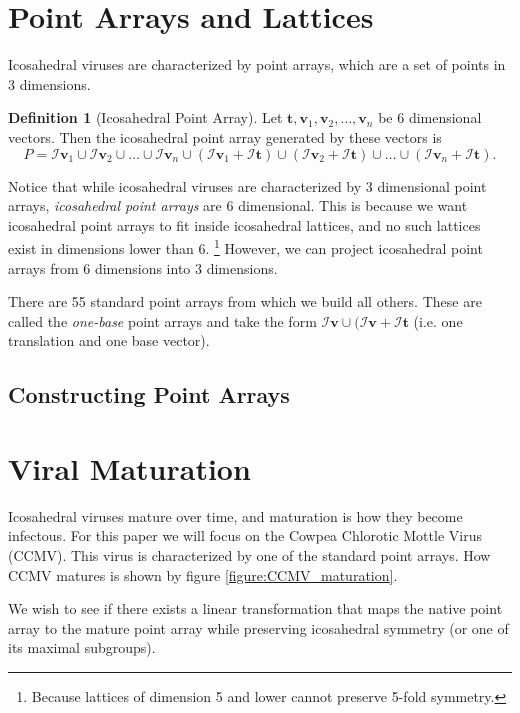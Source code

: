 \documentclass[a4paper,10pt]{article}
\theoremstyle{plain}
\theoremstyle{definition}
\newtheorem{Definition}[Theorem]{Definition}
\theoremstyle{remark}
\renewcommand{\vec}[1]{\textbf{#1}}
\begin{document}
\section{Point Arrays and Lattices}
Icosahedral viruses are characterized by point arrays, which are a set of points in 3 dimensions.
\begin{Definition}[Icosahedral Point Array]
    Let \(\vec{t}, \vec{v}_1, \vec{v}_2, \dots, \vec{v}_n\) be 6 dimensional vectors.
    Then the icosahedral point array generated by these vectors is \[P = \mathcal{I}\vec{v}_1 \cup \mathcal{I}\vec{v}_2 \cup \dots \cup \mathcal{I}\vec{v}_n \cup (\mathcal{I}\vec{v}_1 + \mathcal{I}\vec{t}) \cup (\mathcal{I}\vec{v}_2 + \mathcal{I}\vec{t}) \cup \dots \cup (\mathcal{I}\vec{v}_n + \mathcal{I}\vec{t}).\]
\end{Definition}
Notice that while icosahedral viruses are characterized by 3 dimensional point arrays, \emph{icosahedral point arrays} are 6 dimensional.
This is because we want icosahedral point arrays to fit inside icosahedral lattices, and no such lattices exist in dimensions lower than 6. \footnote{Because lattices of dimension 5 and lower cannot preserve 5-fold symmetry.}
However, we can project icosahedral point arrays from 6 dimensions into 3 dimensions.

There are 55 standard point arrays from which we build all others.
These are called the \emph{one-base} point arrays and take the form \(\mathcal{I}\vec{v} \cup (\mathcal{I}\vec{v} + \mathcal{I}\vec{t}\) (i.e. one translation and one base vector).

\subsection{Constructing Point Arrays}

\section{Viral Maturation}
Icosahedral viruses mature over time, and maturation is how they become infectous.
For this paper we will focus on the Cowpea Chlorotic Mottle Virus (CCMV).
This virus is characterized by one of the standard point arrays.
How CCMV matures is shown by figure \ref{figure:CCMV_maturation}.

We wish to see if there exists a linear transformation that maps the native point array to the mature point array while preserving icosahedral symmetry (or one of its maximal subgroups).
\end{document}
